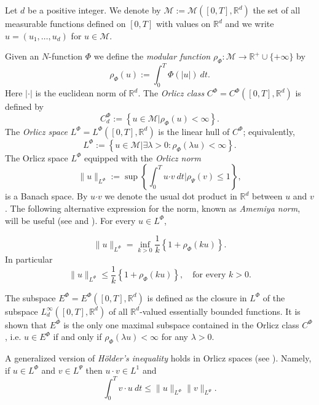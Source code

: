 \documentclass[twoside]{article}
\theoremstyle{remark}
\newcommand{\orlnor}{\|_{L^{\Phi}}}
\newcommand{\lphi}{L^{\Phi}}
\newcommand{\lpsi}{L^{\Psi}}
\newcommand{\ephi}{E^{\Phi}}
\newcommand{\claseor}{C^{\Phi}}
\renewcommand{\b}[1]{\boldsymbol{#1}}
\newcommand{\rr}{\mathbb{R}}
\renewcommand{\leq}{\leqslant}
\begin{document}
Let $d$ be a positive integer. We denote by $\mathcal{M}:=\mathcal{M}([0,T],\rr^d)$ the set of all measurable functions defined on $[0,T]$ with values on $\mathbb{R}^d$ and  we write $u=(u_1,\dots,u_d)$ for  $u\in \mathcal{M}$.



Given  an $N$-function $\Phi$ we define the \emph{modular function} 
$\rho_{\Phi}:\mathcal{M}\to \mathbb{R}^+\cup\{+\infty\}$ by
\[\rho_{\Phi}(u):= \int_0^T \Phi(|u|)\ dt.\]
Here $|\cdot|$ is the euclidean norm of $\mathbb{R}^d$.
The \emph{Orlicz class} $C^{\Phi}=C^{\Phi}([0,T],\rr^d)$  is defined  by
\begin{equation}\label{claseOrlicz}
  C^{\Phi}_d:=\left\{u\in \mathcal{M} | \rho_{\Phi}(u)< \infty \right\}.
\end{equation}
The \emph{Orlicz space} $\lphi=L^{\Phi}([0,T],\rr^d)$ is the linear hull of $\claseor$;
equivalently,
\begin{equation}\label{espacioOrlicz}
\lphi:=\left\{ u\in \mathcal{M}| \exists \lambda>0: \rho_{\Phi}(\lambda u) < \infty   \right\}.
\end{equation}
  The Orlicz space $\lphi$ equipped with the \emph{Orlicz norm}
\[
\|  u  \orlnor:=\sup \left\{  \int_0^T u\b{\cdot} v\ dt \big| \rho_{\Psi}(v)\leq 1\right\},
\]
is a Banach space. By $u\b{\cdot} v$ we denote the usual dot product in $\mathbb{R}^{d}$ between $u$ and $v$.
The following alternative expression for the norm, known as \emph{Amemiya norm},     will  be useful (see \cite[Thm. 10.5]{KR} and \cite{hudzik2000amemiya}). For every $u\in\lphi$,

\begin{equation}\label{amemiya}
\|u\orlnor=\inf\limits_{k>0}\frac{1}{k}\left\{1+\rho_{\Phi}(ku)\right\}.
\end{equation}
In particular
\begin{equation}\label{amemiya-ine}
\|u\orlnor\leq \frac{1}{k}\left\{1+\rho_{\Phi}(ku)\right\},\quad\text{for every } k>0.
\end{equation}


The subspace $\ephi=\ephi([0,T],\rr^d)$ is defined as the closure in $\lphi$ of the subspace $L^{\infty}_d([0,T],\rr^d)$ of all $\mathbb{R}^d$-valued essentially bounded functions. It is shown that  $\ephi$ is the only one maximal subspace contained in the Orlicz class $\claseor$, i.e.
$u\in\ephi$ if and only if $\rho_{\Phi}(\lambda u)<\infty$ for any $\lambda>0$.

A generalized version of \emph{H\"older's inequality} holds in Orlicz spaces (see \cite[Thm. 9.3]{KR}). Namely, if $u\in\lphi$ and $v\in\lpsi$ then $u\cdot v\in L^1$ and
\begin{equation}\label{holder}
\int_0^Tv\cdot u\ dt\leq \|u\orlnor\|v\|_{L^{\Psi}}.
\end{equation}
\end{document}
